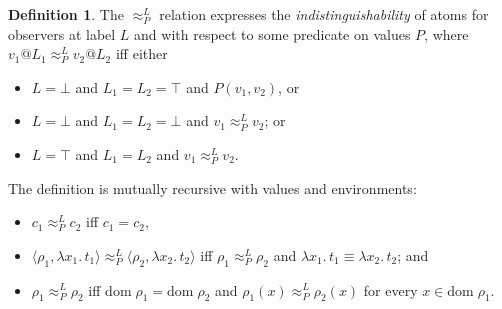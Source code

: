 \documentclass{article}
\makeatletter
\newcommand{\at}{\ensuremath{{\scriptstyle{@}}}}
\theoremstyle{definition}
\newtheorem{definition}[theorem]{Definition}
\makeatother
\begin{document}
\begin{definition}
  The $\approx^{L}_{P}$ relation expresses the \emph{indistinguishability} of
  atoms for observers at label $L$ and with respect to some predicate on values
  $P$, where $v_1 \at L_1 \approx^{L}_{P} v_2 \at L_2$ iff either
  \begin{itemize}
  \item $L = \bot$ and
    $L_1 = L_2 = \top$ and $P(v_1, v_2)$, or
  \item $L = \bot$ and
    $L_1 = L_2 = \bot$ and $v_1 \approx^{L}_{P} v_2$; or
  \item $L = \top$ and $L_1 = L_2$ and $v_1 \approx^{L}_{P} v_2$.
  \end{itemize}
  The definition is mutually recursive with values and environments:
  \begin{itemize}
  \item $c_1 \approx^{L}_{P} c_2$ iff $c_1 = c_2$,
  \item
    $\langle{\rho_1, \lambda{x_1}.\, t_1\rangle} \approx^{L}_{P}
    \langle{\rho_2, \lambda{x_2}.\, t_2\rangle}$ iff
    $\rho_1 \approx^{L}_{P} \rho_2$ and
    $\lambda{x_1}.\, t_1 \equiv \lambda{x_2}.\, t_2$; and
  \item $\rho_1 \approx^{L}_{P} \rho_2$ iff
    $\mathrm{dom}\; \rho_1 = \mathrm{dom}\; \rho_2$ and
    $\rho_1(x) \approx^{L}_{P} \rho_2(x)$ for every
    $x \in \mathrm{dom}\; \rho_1$.
  \end{itemize}
\end{definition}
\end{document}
